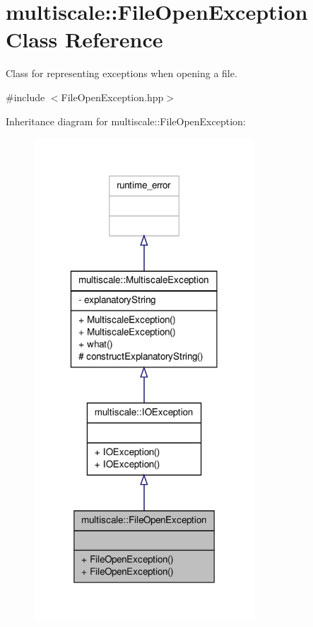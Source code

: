 \hypertarget{classmultiscale_1_1FileOpenException}{\section{multiscale\-:\-:File\-Open\-Exception Class Reference}
\label{classmultiscale_1_1FileOpenException}
}


Class for representing exceptions when opening a file.  




{\ttfamily \#include $<$File\-Open\-Exception.\-hpp$>$}



Inheritance diagram for multiscale\-:\-:File\-Open\-Exception\-:
\nopagebreak
\begin{figure}[H]
\begin{center}
\leavevmode
\includegraphics[width=234pt]{classmultiscale_1_1FileOpenException__inherit__graph}
\end{center}
\end{figure}


